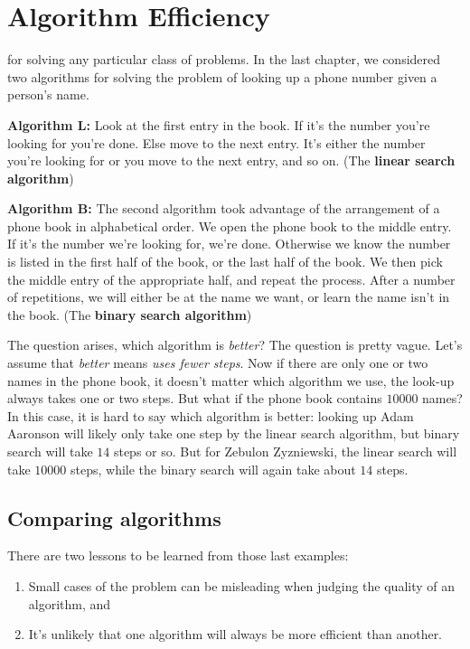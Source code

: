 \chapter{Algorithm Efficiency}

 for solving any particular class 
of problems. In the last chapter, we considered two algorithms for 
solving the problem of looking up a phone number given a person's name.

\noindent\textbf{Algorithm L:} Look at the first entry in the book. 
If it's the number you're looking for you're
done. Else move to the next entry. 
It's either the number you're looking for or you move to the
next entry, and so on. (The {\bfseries linear search algorithm}) 

\noindent\textbf{Algorithm B:} The second algorithm took advantage of the
arrangement of a phone book in alphabetical order.
We open the phone book to the middle entry. If it's the number we're 
looking for, we're done.
Otherwise we know the number is listed in the first half of the book, 
or the last half of the book. We then pick the middle entry
of the appropriate half, and repeat the process. After a number of
repetitions, we will either be at the name we want, or learn the
name isn't in the book. (The {\bfseries {binary search algorithm}}) 

The question arises, which algorithm is {\it better}?
The question is pretty vague. Let's assume that {\it better}
means {\it uses fewer steps}. Now if there are only one or two
names in the phone book, it doesn't matter which algorithm we use,
the look-up always takes one or two steps. But what if the phone
book contains $10000$ names? In this case, it is hard to say
which algorithm is better: looking up Adam Aaronson will likely 
only take one step by the linear search algorithm, but binary
search will take $14$ steps or so. But for   Zebulon Zyzniewski,
the linear search will take $10000$ steps, while the binary search
will again take about $14$ steps.

\section{Comparing algorithms}
There are two lessons to be learned from those last examples:
\begin{enumerate}
 \item Small cases of the problem can be misleading when
 judging the quality of an algorithm, and 
 \item It's unlikely that
 one algorithm will always be more efficient than another.
\end{enumerate}


